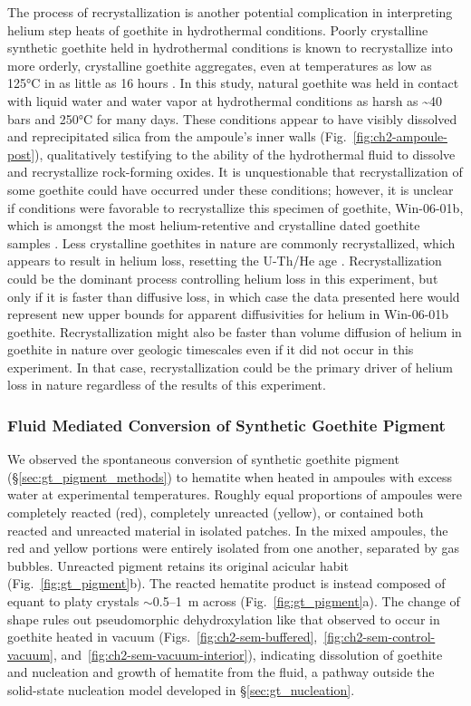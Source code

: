 The process of recrystallization is another potential complication in
interpreting helium step heats of goethite in hydrothermal conditions.
Poorly crystalline synthetic goethite held in hydrothermal conditions is
known to recrystallize into more orderly, crystalline goethite
aggregates, even at temperatures as low as 125°C in as little as 16
hours \citep{schwertmann1985}. In this study, natural goethite was
held in contact with liquid water and water vapor at hydrothermal
conditions as harsh as \textasciitilde40 bars and 250°C for many days. 
These conditions appear to have visibly dissolved and
reprecipitated silica from the ampoule's inner walls (Fig.~\ref{fig:ch2-ampoule-post}),
qualitatively testifying to the ability of the hydrothermal fluid to
dissolve and recrystallize rock-forming oxides. It is unquestionable
that recrystallization of some goethite could have occurred under these
conditions; however, it is unclear if conditions were favorable to
recrystallize this specimen of goethite, Win-06-01b, which is amongst
the most helium-retentive and crystalline dated goethite samples
\citep{waltenberg2012,farley2024}. Less crystalline goethites in
nature are commonly recrystallized, which appears to result in helium
loss, resetting the U-Th/He age \citep{monteiro2018,monteiro2014,heim2006}. 
Recrystallization could be the dominant process
controlling helium loss in this experiment, but only if it is faster
than diffusive loss, in which case the data presented here would
represent new upper bounds for apparent diffusivities for helium in
Win-06-01b goethite. Recrystallization might also be faster than volume
diffusion of helium in goethite in nature over geologic timescales even if it did not occur in this experiment. 
In that case, recrystallization could be the primary driver of helium loss in nature regardless of the results of this experiment.

\subsubsection{Fluid Mediated Conversion of Synthetic Goethite Pigment}\label{sec:gt_pigment}

We observed the spontaneous conversion of synthetic goethite pigment (\S\ref{sec:gt_pigment_methods}) to hematite when 
heated in ampoules with excess water at experimental temperatures. Roughly equal proportions of
ampoules were completely reacted (red), completely unreacted (yellow), or contained both
reacted and unreacted material in isolated patches. In the mixed ampoules, the red and yellow portions were entirely
isolated from one another, separated by gas bubbles. Unreacted pigment retains its original acicular habit
(Fig.~\ref{fig:gt_pigment}b). The reacted hematite product is instead composed of equant to platy crystals
$\sim$0.5--1~\textmu m across (Fig.~\ref{fig:gt_pigment}a). The change of shape rules out pseudomorphic dehydroxylation
like that observed to occur in goethite heated in vacuum (Figs.~\ref{fig:ch2-sem-buffered},~\ref{fig:ch2-sem-control-vacuum}, and~\ref{fig:ch2-sem-vacuum-interior}), indicating dissolution of
goethite and nucleation and growth of hematite from the fluid, a pathway outside the solid-state
nucleation model developed in \S\ref{sec:gt_nucleation}.

